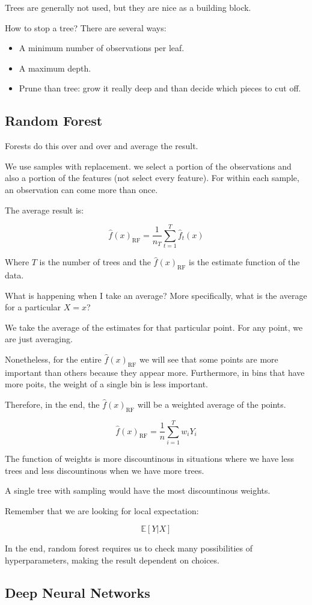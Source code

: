 \documentclass{article}
\begin{document}
Trees are generally not used, but they are nice as a building block.

How to stop a tree? There are several ways:
\begin{itemize}
    \item A minimum number of observations per leaf.
    \item A maximum depth.
    \item Prune than tree: grow it really deep and than decide which pieces to cut off.
\end{itemize}

\subsection{Random Forest}
Forests do this over and over and average the result.

We use samples with replacement. we select a portion of the observations and also a portion of the features (not select every feature). For within each sample, an observation can come more than once.

The average result is:

$$
\hat{f}(x)_{\text{RF}} = \frac{1}{n_T} \sum_{t=1}^{T} \hat{f}_t(x)
$$

Where $T$ is the number of trees and the $\hat{f}(x)_{\text{RF}}$ is the estimate function of the data.

What is happening when I take an average? More specifically, what is the average for a particular $X = x$?

We take the average of the estimates for that particular point. For any point, we are just averaging.

Nonetheless, for the entire $\hat{f}(x)_{\text{RF}}$ we will see that some points are more important than others because they appear more. Furthermore, in bins that have more poits, the weight of a single bin is less important.

Therefore, in the end, the $\hat{f}(x)_{\text{RF}}$ will be a weighted average of the points.

$$
\hat{f}(x)_{\text{RF}} = \frac{1}{n} \sum_{i = 1}^{T} w_i Y_i
$$

The function of weights is more discountinous in situations where we have less trees and less discountinous when we have more trees.

A single tree with sampling would have the most discountinous weights.

Remember that we are looking for local expectation:

$$
\mathbb{E}[Y | X]
$$

In the end, random forest requires us to check many possibilities of hyperparameters, making the result dependent on choices.

\subsection{Deep Neural Networks}
\end{document}
